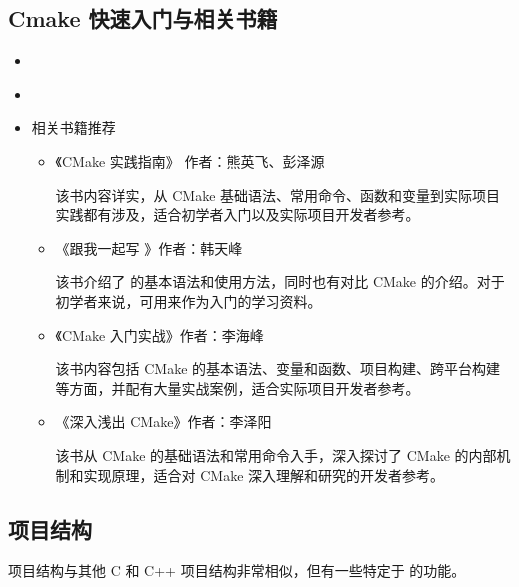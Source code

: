 \documentclass[a4paper,12pt,english]{sphinxmanual}
\begin{document}
\subsection{Cmake 快速入门与相关书籍}
\label{\detokenize{dev-board/clion:id9}}\begin{itemize}
\item {} 
\sphinxAtStartPar
{}

\item {} 
\sphinxAtStartPar
{\hyperref[\detokenize{dev-board/cmake::doc}]{}}

\item {} 
\sphinxAtStartPar
相关书籍推荐
\begin{itemize}
\item {} 
\sphinxAtStartPar
《CMake 实践指南》 作者：熊英飞、彭泽源

\sphinxAtStartPar
该书内容详实，从 CMake 基础语法、常用命令、函数和变量到实际项目实践都有涉及，适合初学者入门以及实际项目开发者参考。

\item {} 
\sphinxAtStartPar
《跟我一起写 》作者：韩天峰

\sphinxAtStartPar
该书介绍了  的基本语法和使用方法，同时也有对比 CMake 的介绍。对于初学者来说，可用来作为入门的学习资料。

\item {} 
\sphinxAtStartPar
《CMake 入门实战》作者：李海峰

\sphinxAtStartPar
该书内容包括 CMake 的基本语法、变量和函数、项目构建、跨平台构建等方面，并配有大量实战案例，适合实际项目开发者参考。

\item {} 
\sphinxAtStartPar
《深入浅出 CMake》作者：李泽阳

\sphinxAtStartPar
该书从 CMake 的基础语法和常用命令入手，深入探讨了 CMake 的内部机制和实现原理，适合对 CMake 深入理解和研究的开发者参考。

\end{itemize}

\end{itemize}


\subsection{ 项目结构}
\label{\detokenize{dev-board/clion:id10}}
\sphinxAtStartPar
{} 项目结构与其他 C 和 C++ 项目结构非常相似，但有一些特定于  的功能。
\end{document}
